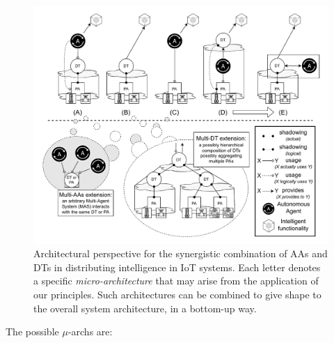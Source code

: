 \begin{figure}[!t]
    \centering
    \includegraphics[width=\columnwidth]{figures/dt-mas/2024-toit-si-architecture-aa-dt.pdf}
    \caption{Architectural perspective for the synergistic combination of AAs and DTs in distributing intelligence in IoT systems. Each letter denotes a specific \emph{micro-architecture} that may arise from the application of our principles. Such architectures can be combined to give shape to the overall system architecture, in a bottom-up way.}
    \label{fig:architecture}
\end{figure}
%
The possible $\mu$-archs are: 
%
